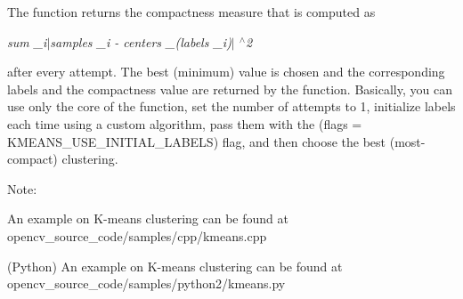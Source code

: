 The function returns the compactness measure that is computed as

{\itshape sum \+\_\+i$\vert$samples \+\_\+i -\/ centers \+\_\+(labels \+\_\+i)$\vert$ $^\wedge$2}

after every attempt. The best (minimum) value is chosen and the corresponding labels and the compactness value are returned by the function. Basically, you can use only the core of the function, set the number of attempts to 1, initialize labels each time using a custom algorithm, pass them with the ({\ttfamily flags} = {\ttfamily K\+M\+E\+A\+N\+S\+\_\+\+U\+S\+E\+\_\+\+I\+N\+I\+T\+I\+A\+L\+\_\+\+L\+A\+B\+E\+LS}) flag, and then choose the best (most-\/compact) clustering.

Note\+:


\begin{DoxyItemize}
\item An example on K-\/means clustering can be found at opencv\+\_\+source\+\_\+code/samples/cpp/kmeans.\+cpp 
\item (Python) An example on K-\/means clustering can be found at opencv\+\_\+source\+\_\+code/samples/python2/kmeans.\+py 
\end{DoxyItemize}


